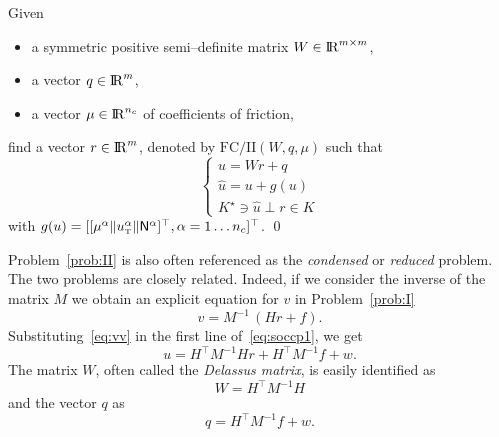 \begin{problem}\label{prob:II}
  Given
  \begin{itemize}
    \item a symmetric positive semi--definite  matrix ${W} \in \mathrm{I\!R}^{m \times m}$,
    \item a vector $ {q} \in \mathrm{I\!R}^m$,
    \item a vector $\mu \in \mathrm{I\!R}^{n_c}$ of coefficients of friction, 
  \end{itemize}
find  a vector $r\in \mathrm{I\!R}^m$, denoted by $\mathrm{FC/II}(W,q,\mu)$  such that
\begin{equation}\label{eq:soccp2}
  \begin{cases}
    u =Wr +q \\[2mm]
    \hat u =u + g(u) \\[2mm]
    K^\star \ni {\hat u} \perp r \in K
  \end{cases}
\end{equation}
with $g(u) = [[\mu^\alpha  \|u^\alpha_{\hbox{\tiny{T}}}\| {\sf N}^\alpha]^\top, \alpha = 1\ldots n_c]^\top$.
\qed
\end{problem}





Problem~\ref{prob:II} is also often referenced as the \emph{condensed} or \emph{reduced} problem. The two problems are closely related. Indeed, if we consider the inverse of the matrix $M$ we obtain an explicit equation for $v$ in Problem~\ref{prob:I}
\begin{equation}
  \label{eq:vv}
  v = M^{-1}\,(Hr +f).
\end{equation}
Substituting~\eqref{eq:vv} in the first line of~\eqref{eq:soccp1}, we get
\begin{equation}
  \label{eq:vv-1}
  u = H^\top M^{-1} H r + H^\top M^{-1} f +w.
\end{equation}
The matrix $W$, often called the \emph{Delassus matrix}, is easily identified as
\begin{equation}
  \label{eq:Delassus}
  W = H^\top M^{-1} H 
\end{equation}
and the vector $q$ as
\begin{equation}
  \label{eq:qq}
  q = H^\top M^{-1} f + w.
\end{equation}

